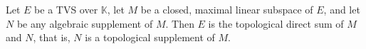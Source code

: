 Let $E$ be a TVS over $\mathbb{K}$, let $M$ be a closed, maximal linear subspace of $E$, and let $N$ be any algebraic supplement of $M$. Then $E$ is the topological direct sum of $M$ and $N$, that is, $N$ is a topological supplement of $M$.
